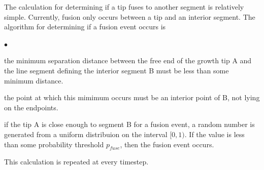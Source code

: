 \documentclass[12pt]{article}
\begin{document}
The calculation for determining if a tip fuses to another segment is relatively
simple. Currently, fusion only occurs between a tip and an interior segment. The
algorithm for determining if a fusion event occurs is
\begin{list}{$\bullet$}{}
\item the minimum separation distance between the free end of the growth tip A
and the line segment defining the interior segment B must be less than some
minimum distance.
\item the point at which this mimimum occurs must be an interior point of B, not
lying on the endpoints.
\item if the tip A is close enough to segment B for a fusion event, a random
number is generated from a uniform distribuion on the interval $[0,1)$. If the value 
is less than some probability threshold $p_{fuse}$, then the fusion event occurs.
\end{list}
This calculation is repeated at every timestep.


\end{document}
